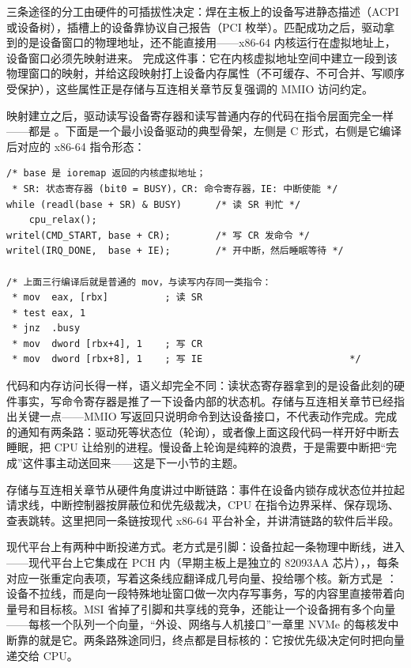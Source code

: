 三条途径的分工由硬件的可插拔性决定：焊在主板上的设备写进静态描述（ACPI 或设备树），插槽上的设备靠协议自己报告（PCI 枚举）。匹配成功之后，驱动拿到的是设备窗口的物理地址，还不能直接用——x86-64 内核运行在虚拟地址上，设备窗口必须先映射进来。 完成这件事：它在内核虚拟地址空间中建立一段到该物理窗口的映射，并给这段映射打上设备内存属性（不可缓存、不可合并、写顺序受保护），这些属性正是存储与互连相关章节反复强调的 MMIO 访问约定。

映射建立之后，驱动读写设备寄存器和读写普通内存的代码在指令层面完全一样——都是 。下面是一个最小设备驱动的典型骨架，左侧是 C 形式，右侧是它编译后对应的 x86-64 指令形态：

\begin{lstlisting}
/* base 是 ioremap 返回的内核虚拟地址；
 * SR: 状态寄存器 (bit0 = BUSY)，CR: 命令寄存器，IE: 中断使能 */
while (readl(base + SR) & BUSY)      /* 读 SR 判忙 */
    cpu_relax();
writel(CMD_START, base + CR);        /* 写 CR 发命令 */
writel(IRQ_DONE,  base + IE);        /* 开中断，然后睡眠等待 */

/* 上面三行编译后就是普通的 mov，与读写内存同一类指令：
 * mov  eax, [rbx]          ; 读 SR
 * test eax, 1
 * jnz  .busy
 * mov  dword [rbx+4], 1    ; 写 CR
 * mov  dword [rbx+8], 1    ; 写 IE                          */
\end{lstlisting}

代码和内存访问长得一样，语义却完全不同：读状态寄存器拿到的是设备此刻的硬件事实，写命令寄存器是推了一下设备内部的状态机。存储与互连相关章节已经指出关键一点——MMIO 写返回只说明命令到达设备接口，不代表动作完成。完成的通知有两条路：驱动死等状态位（轮询），或者像上面这段代码一样开好中断去睡眠，把 CPU 让给别的进程。慢设备上轮询是纯粹的浪费，于是需要中断把“完成”这件事主动送回来——这是下一小节的主题。


存储与互连相关章节从硬件角度讲过中断链路：事件在设备内锁存成状态位并拉起请求线，中断控制器按屏蔽位和优先级裁决，CPU 在指令边界采样、保存现场、查表跳转。这里把同一条链按现代 x86-64 平台补全，并讲清链路的软件后半段。

现代平台上有两种中断投递方式。老方式是引脚：设备拉起一条物理中断线，进入 ——现代平台上它集成在 PCH 内（早期主板上是独立的 82093AA 芯片），，每条对应一张重定向表项，写着这条线应翻译成几号向量、投给哪个核。新方式是 ：设备不拉线，而是向一段特殊地址窗口做一次内存写事务，写的内容里直接带着向量号和目标核。MSI 省掉了引脚和共享线的竞争，还能让一个设备拥有多个向量——每核一个队列一个向量，“外设、网络与人机接口”一章里 NVMe 的每核发中断靠的就是它。两条路殊途同归，终点都是目标核的：它按优先级决定何时把向量递交给 CPU。

